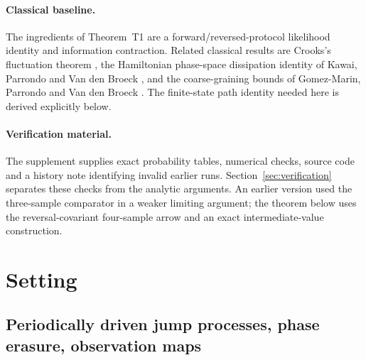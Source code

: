 \documentclass[10pt]{article}
\theoremstyle{definition}
\begin{document}
\paragraph{Classical baseline.}
The ingredients of Theorem~T1 are a forward/reversed-protocol
likelihood identity and information contraction. Related classical
results are Crooks's fluctuation theorem \cite{Crooks1999},
the Hamiltonian phase-space dissipation identity of Kawai, Parrondo and
Van den Broeck \cite{KPV2007}, and the coarse-graining bounds of
Gomez-Marin, Parrondo and Van den Broeck \cite{GPV2008}.
The finite-state path identity needed here is derived explicitly below.

\paragraph{Verification material.}
The supplement \cite{EP1Brecord} supplies exact probability tables,
numerical checks, source code and a history note identifying invalid
earlier runs. Section~\ref{sec:verification} separates these checks from
the analytic arguments. An earlier version used the three-sample
comparator in a weaker limiting argument; the theorem below uses the
reversal-covariant four-sample arrow and an exact intermediate-value
construction.

\section{Setting}
\label{sec:setting}

\subsection{Periodically driven jump processes, phase erasure, observation maps}
\end{document}

